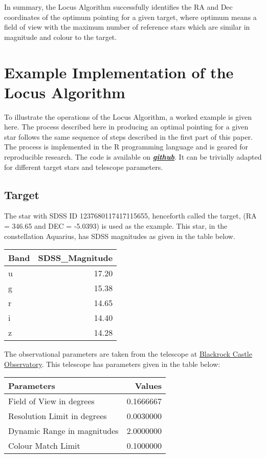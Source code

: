 \documentclass[]{elsarticle} %
\begin{document}
In summary, the Locus Algorithm successfully identifies the RA and Dec
coordinates of the optimum pointing for a given target, where optimum
means a field of view with the maximum number of reference stars which
are similar in magnitude and colour to the target.

\newpage

\hypertarget{example-implementation-of-the-locus-algorithm}{%
\section{Example Implementation of the Locus
Algorithm}\label{example-implementation-of-the-locus-algorithm}}

To illustrate the operations of the Locus Algorithm, a worked example is
given here. The process described here in producing an optimal pointing
for a given star follows the same sequence of steps described in the
first part of this paper. The process is implemented in the R
programming language and is geared for reproducible research. The code
is available on
\emph{\textbf{\href{https://github.com/eugene100hickey/LocusAlgorithm}{github}}}.
It can be trivially adapted for different target stars and telescope
parameters.

\hypertarget{target}{%
\subsection{Target}\label{target}}

The star with SDSS ID 1237680117417115655, henceforth called the target,
(RA = 346.65 and DEC = -5.0393) is used as the example. This star, in
the constellation Aquarius, has SDSS magnitudes as given in the table
below.

\begin{tabular}{l|r}
\hline
Band & SDSS\_Magnitude\\
\hline
u & 17.20\\
\hline
g & 15.38\\
\hline
r & 14.65\\
\hline
i & 14.40\\
\hline
z & 14.28\\
\hline
\end{tabular}

The observational parameters are taken from the telescope at
\href{www.bco.ie}{Blackrock Castle Observatory}. This telescope has
parameters given in the table below:

\begin{tabular}{l|r}
\hline
Parameters & Values\\
\hline
Field of View in degrees & 0.1666667\\
\hline
Resolution Limit in degrees & 0.0030000\\
\hline
Dynamic Range in magnitudes & 2.0000000\\
\hline
Colour Match Limit & 0.1000000\\
\hline
\end{tabular}
\end{document}
